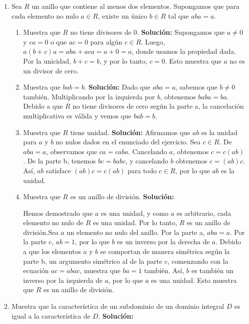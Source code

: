 \begin{enumerate}
	\item Sea $R$ un anillo que contiene al menos dos elementos. Supongamos que para cada elemento no nulo $a \in R$, existe un único $b \in R$ tal que $aba = a$.
	\begin{enumerate}
		\item Muestra que $R$ no tiene divisores de $0$.
		\textbf{Solución:}
		Supongamos que $a \neq 0$ y $ca = 0$ o que $ac=0$ para algún $c \in R$. Luego, $a(b + c)a = aba + aca = a + 0 = a$, donde usamos la propiedad dada. Por la unicidad, $b + c = b$, y por lo tanto, $c = 0$. Esto muestra que $a$ no es un divisor de cero.
		\item Muestra que $bab = b$.
		\textbf{Solución:}
		Dado que \(aba = a\), sabemos que \(b \not = 0\) también. Multiplicando por la izquierda por \(b\), obtenemos \(baba = ba\). Debido a que \(R\) no tiene divisores de cero según la parte a, la cancelación multiplicativa es válida y vemos que \(bab = b\).
		
		\item Muestra que $R$ tiene unidad.
		\textbf{Solución:}
		Afirmamos que \(ab\) es la unidad para \(a\) y \(b\) no nulos dados en el enunciado del ejercicio. Sea \(c \in R\). De \(aba = a\), observamos que \(ca = caba\). Cancelando \(a\), obtenemos \(c = c(ab)\). De la parte b, tenemos \(bc = babc\), y cancelando \(b\) obtenemos \(c = (ab)c\). Así, \(ab\) satisface \((ab)c = c(ab)\) para todo \(c \in R\), por lo que \(ab\) es la unidad.
		
		\item Muestra que $R$ es un anillo de división.
		\textbf{Solución:}
		
		Hemos demostrado que $a$ es una unidad, y como $a$ es arbitrario, cada elemento no nulo de $R$ es una unidad. Por lo tanto, $R$ es un anillo de división.Sea \(a\) un elemento no nulo del anillo. Por la parte a, \(aba = a\). Por la parte c, \(ab = 1\), por lo que \(b\) es un inverso por la derecha de \(a\). Debido a que los elementos \(a\) y \(b\) se comportan de manera simétrica según la parte b, un argumento simétrico al de la parte c, comenzando con la ecuación \(ac = abac\), muestra que \(ba = 1\) también. Así, \(b\) es también un inverso por la izquierda de \(a\), por lo que \(a\) es una unidad. Esto muestra que \(R\) es un anillo de división.
		
		
	\end{enumerate}
	\item Muestra que la característica de un subdominio de un dominio integral $D$ es igual a la característica de $D$.
	\textbf{Solución:}
	

\end{enumerate}
